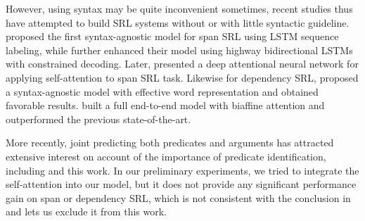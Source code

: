 \documentclass[letterpaper]{article} %
\begin{document}
However, using syntax may be quite inconvenient sometimes, %
recent studies thus have attempted to build SRL systems without or with little syntactic guideline. \citeauthor{zhou-xu2015}  proposed the first syntax-agnostic model for span SRL using LSTM sequence labeling,
while \citeauthor{he-acl2017}  further enhanced their model using highway bidirectional LSTMs with constrained decoding. Later, \citeauthor{selfatt2018}  presented a deep attentional neural network for applying self-attention to span SRL task. Likewise for dependency SRL, \citeauthor{marcheggiani2017}  proposed a syntax-agnostic model with effective word representation and obtained favorable results. \citeauthor{cai2018full}  built a full end-to-end model with biaffine attention and outperformed the previous state-of-the-art.

More recently, joint predicting both predicates and arguments has attracted extensive interest on account of the importance of predicate identification, including %
\cite{he-acl2017,Strubell2018,he2018jointly,cai2018full} and this work.
In our preliminary experiments, we tried to integrate the self-attention into our model,
but it does not provide any significant performance gain on span or dependency SRL, which is not consistent with the conclusion in \cite{selfatt2018} and lets us exclude it from this work. 
\end{document}
